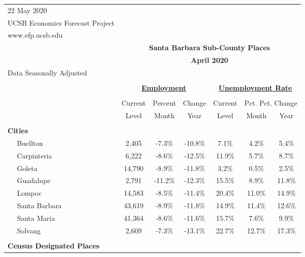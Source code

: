 \documentclass[12pt]{article}
\begin{document}
\begin{landscape}
\begin{table}
\begin{tabular}{|l|c|c|c||c|c|c|}
\multicolumn{1}{l}{\small 22 May 2020} & \multicolumn{6}{c}{} \\
\multicolumn{1}{l}{\small UCSB Economics Forecast Project} & \multicolumn{6}{c}{} \\
\multicolumn{1}{l}{\small www.efp.ucsb.edu} & \multicolumn{6}{c}{} \\
\multicolumn{1}{c}{} & \multicolumn{6}{c}{\large \textbf{Santa Barbara Sub-County Places}} \\
\multicolumn{1}{c}{} & \multicolumn{6}{c}{\large \textbf{April 2020}} \\
\multicolumn{7}{l}{\small Data Seasonally Adjusted} \\ \hline \hline
& \multicolumn{5}{c}{} & \\
& \multicolumn{3}{c}{\textbf{\underline{Employment}} } & \multicolumn{3}{c}{\textbf{\underline{Unemployment Rate}} } \vline \\
& \multicolumn{2}{c}{} & & \multicolumn{2}{c}{} & \\
& Current & \multicolumn{1}{r}{Percent} & Change & Current & \multicolumn{2}{c}{Pct. Pct. Change} \vline \\
& Level & Month & Year & Level & Month & Year \\ \hline
&&&&&& \\
\textbf{Cities} &&&&&& \\
$\quad$ Buellton & 2,405 & -7.3\% & -10.8\% & 7.1\% & 4.2\% & 5.4\% \\
$\quad$ Carpinteria & 6,222 & -8.6\% & -12.5\% & 11.9\% & 5.7\% & 8.7\% \\
$\quad$ Goleta & 14,790 & -8.9\% & -11.8\% & 3.2\% & 0.5\% & 2.5\% \\
$\quad$ Guadalupe & 2,791 & -11.2\% & -12.3\% & 15.5\% & 8.9\% & 11.8\% \\
$\quad$ Lompoc & 14,583 & -8.5\% & -11.4\% & 20.4\% & 11.0\% & 14.9\% \\
$\quad$ Santa Barbara & 43,619 & -8.9\% & -11.8\% & 14.9\% & 11.4\% & 12.6\% \\
$\quad$ Santa Maria & 41,364 & -8.6\% & -11.6\% & 15.7\% & 7.6\% & 9.9\% \\
$\quad$ Solvang & 2,609 & -7.3\% & -13.1\% & 22.7\% & 12.7\% & 17.3\% \\
&&&&&& \\
\textbf{Census Designated Places} &&&&&& \\

\end{tabular}
\end{table}
\end{landscape}
\end{document}
